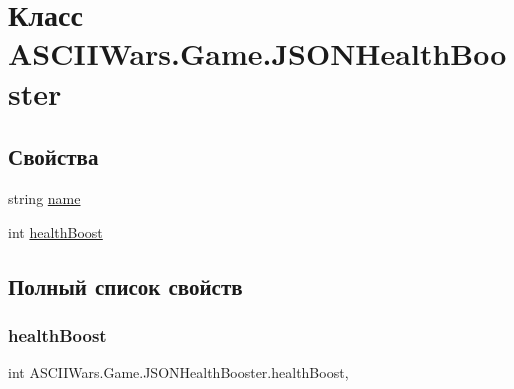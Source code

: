 \hypertarget{class_a_s_c_i_i_wars_1_1_game_1_1_j_s_o_n_health_booster}{}\section{Класс A\+S\+C\+I\+I\+Wars.\+Game.\+J\+S\+O\+N\+Health\+Booster}
\label{class_a_s_c_i_i_wars_1_1_game_1_1_j_s_o_n_health_booster}
\subsection*{Свойства}
\begin{DoxyCompactItemize}
\item 
string \hyperlink{class_a_s_c_i_i_wars_1_1_game_1_1_j_s_o_n_health_booster_ab7da845b4a7190d58447278a8d6176c8}{name}
\item 
int \hyperlink{class_a_s_c_i_i_wars_1_1_game_1_1_j_s_o_n_health_booster_a28beed5117608087899c78103f3f8ba4}{health\+Boost}
\end{DoxyCompactItemize}


\subsection{Полный список свойств}
\hypertarget{class_a_s_c_i_i_wars_1_1_game_1_1_j_s_o_n_health_booster_a28beed5117608087899c78103f3f8ba4}{}\label{class_a_s_c_i_i_wars_1_1_game_1_1_j_s_o_n_health_booster_a28beed5117608087899c78103f3f8ba4} 
\subsubsection{\texorpdfstring{health\+Boost}{healthBoost}}
{\footnotesize\ttfamily int A\+S\+C\+I\+I\+Wars.\+Game.\+J\+S\+O\+N\+Health\+Booster.\+health\+Boost\hspace{0.3cm}{\ttfamily [get]}, {\ttfamily [set]}}

\hypertarget{class_a_s_c_i_i_wars_1_1_game_1_1_j_s_o_n_health_booster_ab7da845b4a7190d58447278a8d6176c8}{}\label{class_a_s_c_i_i_wars_1_1_game_1_1_j_s_o_n_health_booster_ab7da845b4a7190d58447278a8d6176c8} 
